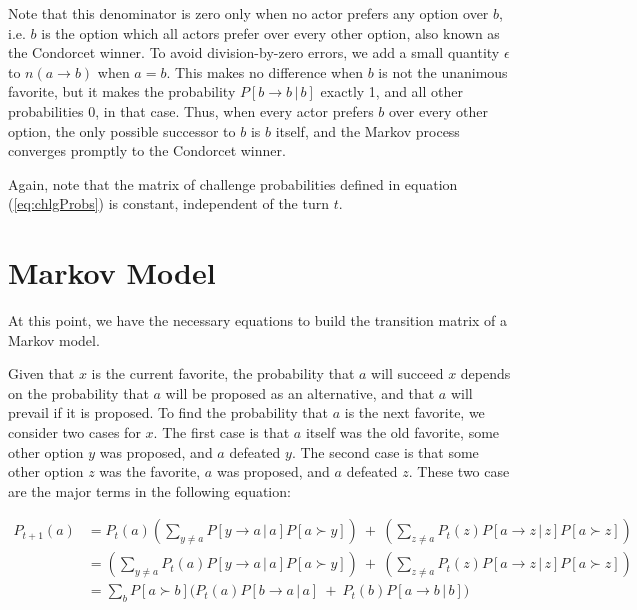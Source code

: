 \documentclass[a4paper,10pt]{article}
\begin{document}
Note that this denominator is zero only when no actor prefers any option over $b$, i.e. $b$ is the option which all actors prefer over 
every other option,
 also known as the Condorcet winner. To avoid division-by-zero errors, we add a small quantity $\epsilon$
 to $n(a \rightarrow b)$ when $a=b$. 
This makes no difference when $b$ is not the unanimous favorite, but it makes the probability $P[b   \rightarrow  b   \, | \, b ]$ exactly 1, and 
all other probabilities 0, in that case. Thus, when every actor prefers $b$ over every other option, the only possible
 successor to $b$ is $b$ itself, and the Markov process converges promptly to the  Condorcet winner.

Again, note that the matrix of challenge probabilities defined in equation (\ref{eq:chlgProbs}) is constant, independent of the turn $t$.


\section{Markov Model}


At this point, we have the necessary equations to build the transition matrix of a Markov model.

Given that $x$ is the current favorite, the probability that $a$ will succeed $x$  depends on the probability that $a$ will
 be proposed as an alternative, and that $a$ will prevail if it is proposed. To find the probability that $a$ is the
 next favorite, we consider two cases for $x$. 
The first case is that $a$ itself was the old favorite,   some other option $y$ was proposed, and $a$ defeated $y$.
The second case is that some other option $z$ was the favorite, $a$ was proposed, and $a$ defeated $z$. These two
case are the major terms in the following equation:

\begin{align} \label{eq:basicTransProbs}
P_{t+1}(a) 
&= P_{t}(a) \left( \sum_{y\neq a} P[y  \rightarrow a   \, | \, a]P[a\succ y] \right) 
         \: + \:  \left( \sum_{z \neq a} P_{t}( z )  P[a  \rightarrow z   \, | \, z]P[a\succ z] \right)  \\
&= \left( \sum_{y \neq a}  P_{t}(a )  P[y  \rightarrow a   \, | \, a]P[a\succ y] \right) 
         \: + \: \left( \sum_{z \neq a} P_{t}( z )  P[a  \rightarrow z   \, | \, z]P[a\succ z]  \right)  \\
&= \sum_{b} P[a \succ b] \Big(  P_{t}(a) P[b   \rightarrow a   \, | \, a] 
         \: + \: P_{t}(b) P[a   \rightarrow b   \, | \, b] \Big)  \label{eq:basicTransProbs}
\end{align}
\end{document}
